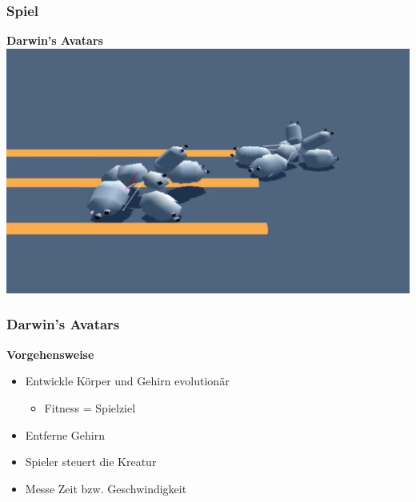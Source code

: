 \documentclass{beamer}
\begin{document}
\begin{frame}[plain]
\end{frame}

\usebackgroundtemplate{}

\begin{frame}
	\frametitle{Spiel}
	\textbf{Darwin's Avatars}\\
	\vspace{0.5em}
	\includegraphics[width=\textwidth]{img/games/darwin.png}
\end{frame}

\begin{frame}
	\frametitle{Darwin's Avatars}
	\textbf{Vorgehensweise}\\ \pause
	\begin{itemize}
		\item Entwickle Körper und Gehirn evolutionär \pause
		\begin{itemize}
			\item Fitness = Spielziel \pause
		\end{itemize} 
		\item Entferne Gehirn \pause
		\item Spieler steuert die Kreatur \pause
		\item Messe Zeit bzw. Geschwindigkeit
	\end{itemize}	
\end{frame}
\end{document}
